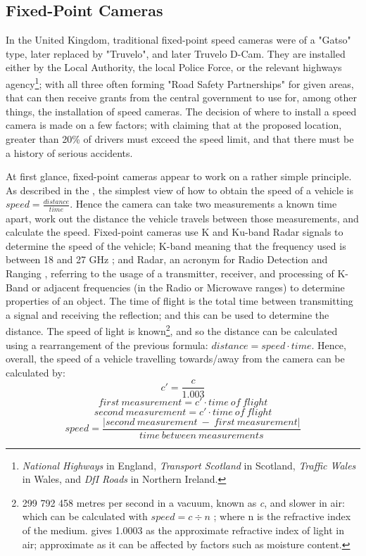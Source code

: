 \documentclass[11pt, a4paper, notitlepage]{report}
\begin{document}
\subsection{Fixed-Point Cameras}
In the United Kingdom, traditional fixed-point speed cameras were of a "Gatso" type, later replaced by "Truvelo", and later Truvelo D-Cam. They are installed either by the Local Authority, the local Police Force, or the relevant highways agency\footnote{\textit{National Highways} in England, \textit{Transport Scotland} in Scotland, \textit{Traffic Wales} in Wales, and \textit{DfI Roads} in Northern Ireland.}; with all three often forming "Road Safety Partnerships" for given areas, that can then receive grants from the central government \citep{RSPGrantDetails} to use for, among other things, the installation of speed cameras. The decision of where to install a speed camera is made on a few factors; with \citet{SpeedCameraInstalltion} claiming that at the proposed location, greater than 20\% of drivers must exceed the speed limit, and that there must be a history of serious accidents.

At first glance, fixed-point cameras appear to work on a rather simple principle. As described in the , the simplest view of how to obtain the speed of a vehicle is $ speed = \frac{distance}{time} $. Hence the camera can take two measurements a known time apart, work out the distance the vehicle travels between those measurements, and calculate the speed. 
Fixed-point cameras use K and Ku-band Radar signals to determine the speed of the vehicle; K-band meaning that the frequency used is between 18 and 27 GHz \citep{IEEERadar}; and Radar, an acronym for Radio Detection and Ranging \citep{RadarNaming}, referring to the usage of a transmitter, receiver, and processing of K-Band or adjacent frequencies (in the Radio or Microwave ranges) to determine properties of an object. The time of flight is the total time between transmitting a signal and receiving the reflection; and this can be used to determine the distance. The speed of light is known\footnote{299 792 458 metres per second in a vacuum, known as \textit{c}, and slower in air: which can be calculated with $ speed = c \div n $ \citep{HechtOptics}; where n is the refractive index of the medium. \citet{refIndxAir} gives 1.0003 as the approximate refractive index of light in air; approximate as it can be affected by factors such as moisture content.}, and so the distance can be calculated using a rearrangement of the previous formula: $ distance = speed  \cdot time $. Hence, overall, the speed of a vehicle travelling towards/away from the camera can be calculated by:
\begin{equation}
	c' = \frac{c}{1.003}
\end{equation}
\begin{equation}
	first~measurement = c' \cdot time~of~flight
\end{equation}
\begin{equation}
	second~measurement = c' \cdot time~of~flight
\end{equation}
\begin{equation}
	speed = \frac{\left|second~measurement~-~first~measurement\right|}{time~between~measurements}
\end{equation}
\end{document}
